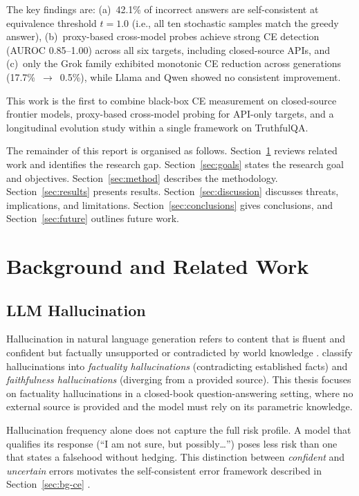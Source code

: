 \documentclass[12pt,twocolumn]{article}
\begin{document}
The key findings are: (a)~42.1\% of incorrect answers are
self-consistent at equivalence threshold $t{=}1.0$ (i.e., all ten
stochastic samples match the greedy answer), (b)~proxy-based
cross-model probes achieve strong CE detection (AUROC 0.85--1.00)
across all six targets, including closed-source APIs, and (c)~only
the Grok family exhibited monotonic CE reduction across generations
(17.7\%~$\to$~0.5\%), while Llama and Qwen showed no consistent
improvement.

This work is the first to combine black-box CE measurement on
closed-source frontier models, proxy-based cross-model probing for
API-only targets, and a longitudinal evolution study within a single
framework on TruthfulQA.

The remainder of this report is organised as follows.
Section~\ref{sec:background} reviews related work and identifies the
research gap. Section~\ref{sec:goals} states the research goal and
objectives. Section~\ref{sec:method} describes the methodology.
Section~\ref{sec:results} presents results.
Section~\ref{sec:discussion} discusses threats, implications, and
limitations. Section~\ref{sec:conclusions} gives conclusions, and
Section~\ref{sec:future} outlines future work.

\section{Background and Related Work}
\label{sec:background}

\subsection{LLM Hallucination}
\label{sec:bg-hallucination}

Hallucination in natural language generation refers to content that is
fluent and confident but factually unsupported or contradicted by
world knowledge \citep{ji2023hallucination}. \citet{huang2025survey}
classify hallucinations into
\emph{factuality hallucinations} (contradicting established facts)
and \emph{faithfulness hallucinations} (diverging from a provided
source). This thesis focuses on factuality hallucinations in a
closed-book question-answering setting, where no external source is
provided and the model must rely on its parametric knowledge.

Hallucination frequency alone does not capture the full risk
profile. A model that qualifies its response (``I am not sure, but
possibly\ldots'') poses less risk than one that states a falsehood
without hedging. This distinction between \emph{confident} and
\emph{uncertain} errors motivates the self-consistent error
framework described in Section~\ref{sec:bg-ce}
\citep{tan2025consistent}.
\end{document}
